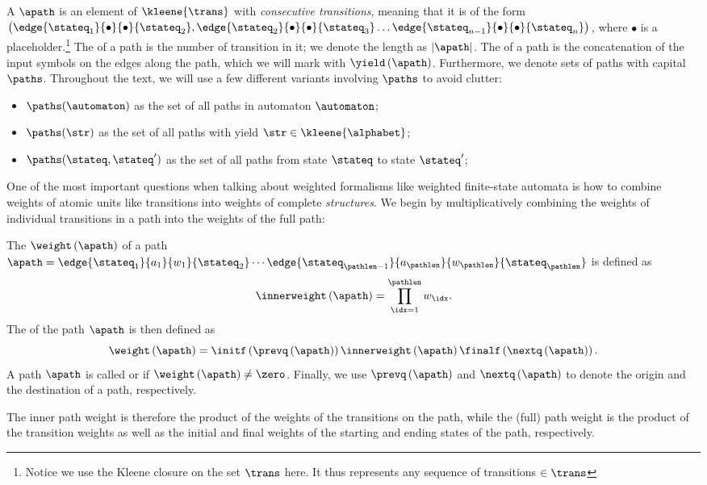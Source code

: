 \begin{definition}[Path]
A  $\apath$ is an element of $\kleene{\trans}$ with \emph{consecutive transitions}, meaning that it is of the form $\left( \edge{\stateq_1}{\bullet}{\bullet}{\stateq_2}, \edge{\stateq_2}{\bullet}{\bullet}{\stateq_3} \ldots  \edge{\stateq_{n-1}}{\bullet}{\bullet}{\stateq_n}\right) $, where $\bullet$ is a placeholder.\footnote{Notice we use the Kleene closure on the set $\trans$ here. It thus represents any sequence of transitions $\in \trans$}
The  of a path is the number of transition in it; we denote the length as $|\apath|$.
The  of a path is the concatenation of the input symbols on the edges along the path, which we will mark with $\yield\left(\apath\right)$. 
Furthermore, we denote sets of paths with capital $\paths$. 
Throughout the text, we will use a few different variants involving $\paths$ to avoid clutter:
\begin{itemize}
    \item $\paths(\automaton)$ as the set of all paths in automaton $\automaton$;
    \item $\paths(\str)$ as the set of all paths with yield $\str \in \kleene{\alphabet}$;
    \item $\paths(\stateq, \stateq')$ as the set of all paths from state $\stateq$ to state $\stateq'$;
    \end{itemize}
\end{definition} 

One of the most important questions when talking about weighted formalisms like weighted finite-state automata is how to combine weights of atomic units like transitions into weights of complete \emph{structures}.
We begin by multiplicatively combining the weights of individual transitions in a path into the weights of the full path:
\begin{definition}
The  $\weight\left(\apath\right)$ of a path $\apath = \edge{\stateq_1}{a_1}{w_1}{\stateq_2} \cdots \edge{\stateq_{\pathlen-1}}{a_\pathlen}{w_\pathlen}{\stateq_\pathlen}$ is defined as 
\begin{equation}
\innerweight\left(\apath\right) = \prod_{\idx = 1}^\pathlen w_\idx.
\end{equation}
The  of the path $\apath$ is then defined as 
\begin{equation}
\weight\left(\apath\right) = \initf \left( \prevq \left( \apath \right) \right) \innerweight \left( \apath \right) \finalf \left( \nextq \left( \apath \right) \right).
\end{equation}
A path $\apath$ is called  or  if $\weight\left(\apath\right) \neq \zero$. 
Finally, we use $\prevq\left(\apath\right)$ and $\nextq\left(\apath\right)$ to denote the origin and the destination of a path, respectively.
\end{definition}
The inner path weight is therefore the product of the weights of the transitions on the path, while the (full) path weight is the product of the transition weights as well as the initial and final weights of the starting and ending states of the path, respectively.

